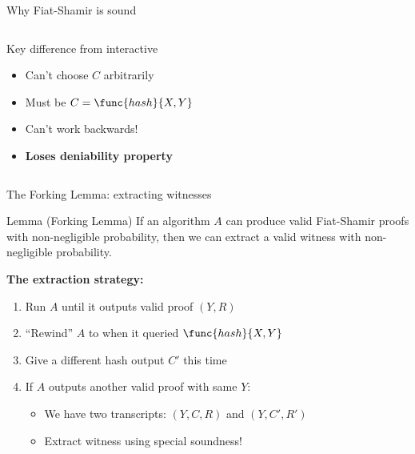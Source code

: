 \documentclass[aspectratio=169, lualatex, handout]{beamer}
\begin{document}
\begin{frame}{Why Fiat-Shamir is sound}
\begin{columns}[c]
\begin{column}{0.5\textwidth}
\begin{alertblock}{Key difference from interactive}
\begin{itemize}
					      \begin{itemize}
						      \item Can't choose $C$ arbitrarily
						      \item Must be $C = \func{hash}{X, Y}$
						      \item Can't work backwards!
						      \item \textbf{Loses deniability property}
					      \end{itemize}
				\end{itemize}
			\end{alertblock}
		\end{column}
	\end{columns}
\end{frame}

\begin{frame}{The Forking Lemma: extracting witnesses}
	\begin{block}{Lemma (Forking Lemma)}
		If an algorithm $A$ can produce valid Fiat-Shamir proofs with non-negligible probability, then we can extract a valid witness with non-negligible probability.
	\end{block}
	\vspace{0.5em}
	\textbf{The extraction strategy:}
	\begin{enumerate}
		\item Run $A$ until it outputs valid proof $(Y, R)$
		\item ``Rewind'' $A$ to when it queried $\func{hash}{X, Y}$
		\item Give a different hash output $C'$ this time
		\item If $A$ outputs another valid proof with same $Y$:
		      \begin{itemize}
			      \item We have two transcripts: $(Y, C, R)$ and $(Y, C', R')$
			      \item Extract witness using special soundness!
		      \end{itemize}
	\end{enumerate}
\end{frame}
\end{document}
